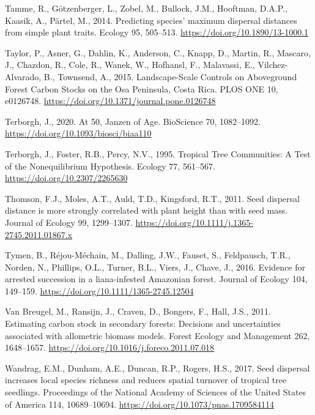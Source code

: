 \documentclass[
  12pt,
]{article}
\newlength{\cslhangindent}
\newlength{\cslentryspacingunit} %
\newenvironment{CSLReferences}[2] %
 {%
  \setlength{\parindent}{0pt}
  \ifodd #1
  \let\oldpar\par
  \def\par{\hangindent=\cslhangindent\oldpar}
  \fi
  \setlength{\parskip}{#2\cslentryspacingunit}
 }%
 {}
\begin{document}
\begin{CSLReferences}{1}{0}
\leavevmode{}%
Tamme, R., Götzenberger, L., Zobel, M., Bullock, J.M., Hooftman, D.A.P., Kaasik, A., Pärtel, M., 2014. Predicting species' maximum dispersal distances from simple plant traits. Ecology 95, 505--513. \url{https://doi.org/10.1890/13-1000.1}

\leavevmode{}%
Taylor, P., Asner, G., Dahlin, K., Anderson, C., Knapp, D., Martin, R., Mascaro, J., Chazdon, R., Cole, R., Wanek, W., Hofhansl, F., Malavassi, E., Vilchez-Alvarado, B., Townsend, A., 2015. Landscape-{Scale Controls} on {Aboveground Forest Carbon Stocks} on the {Osa Peninsula}, {Costa Rica}. PLOS ONE 10, e0126748. \url{https://doi.org/10.1371/journal.pone.0126748}

\leavevmode{}%
Terborgh, J., 2020. At 50, {Janzen} of {Age}. BioScience 70, 1082--1092. \url{https://doi.org/10.1093/biosci/biaa110}

\leavevmode{}%
Terborgh, J., Foster, R.B., Percy, N.V., 1995. Tropical {Tree Communities}: {A Test} of the {Nonequilibrium Hypothesis}. Ecology 77, 561--567. \url{https://doi.org/10.2307/2265630}

\leavevmode{}%
Thomson, F.J., Moles, A.T., Auld, T.D., Kingsford, R.T., 2011. Seed dispersal distance is more strongly correlated with plant height than with seed mass. Journal of Ecology 99, 1299--1307. \url{https://doi.org/10.1111/j.1365-2745.2011.01867.x}

\leavevmode{}%
Tymen, B., Réjou-Méchain, M., Dalling, J.W., Fauset, S., Feldpausch, T.R., Norden, N., Phillips, O.L., Turner, B.L., Viers, J., Chave, J., 2016. Evidence for arrested succession in a liana-infested {Amazonian} forest. Journal of Ecology 104, 149--159. \url{https://doi.org/10.1111/1365-2745.12504}

\leavevmode{}%
Van Breugel, M., Ransijn, J., Craven, D., Bongers, F., Hall, J.S., 2011. Estimating carbon stock in secondary forests: {Decisions} and uncertainties associated with allometric biomass models. Forest Ecology and Management 262, 1648--1657. \url{https://doi.org/10.1016/j.foreco.2011.07.018}

\leavevmode{}%
Wandrag, E.M., Dunham, A.E., Duncan, R.P., Rogers, H.S., 2017. Seed dispersal increases local species richness and reduces spatial turnover of tropical tree seedlings. Proceedings of the National Academy of Sciences of the United States of America 114, 10689--10694. \url{https://doi.org/10.1073/pnas.1709584114}


\end{CSLReferences}
\end{document}
